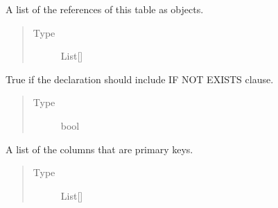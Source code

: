 \documentclass[letterpaper,10pt,english]{sphinxmanual}
\begin{document}
\begin{fulllineitems}
\begin{fulllineitems}
\end{fulllineitems}


\begin{fulllineitems}
\label{\detokenize{model:mini_sql.model.table.Table.__references}}
\sphinxAtStartPar
A list of the references of this table as objects.
\begin{quote}\begin{description}
\item[{Type}] \leavevmode
\sphinxAtStartPar
List{[}{\hyperref[\detokenize{model:mini_sql.model.foreign_key.ForeignKey}]{}}{]}

\end{description}\end{quote}

\end{fulllineitems}


\begin{fulllineitems}
\label{\detokenize{model:mini_sql.model.table.Table.__if_not_exists}}
\sphinxAtStartPar
True if the declaration should include IF NOT EXISTS clause.
\begin{quote}\begin{description}
\item[{Type}] \leavevmode
\sphinxAtStartPar
bool

\end{description}\end{quote}

\end{fulllineitems}


\begin{fulllineitems}
\label{\detokenize{model:mini_sql.model.table.Table.__primary_keys}}
\sphinxAtStartPar
A list of the columns that are primary keys.
\begin{quote}\begin{description}
\item[{Type}] \leavevmode
\sphinxAtStartPar
List{[}{\hyperref[\detokenize{model:mini_sql.model.column.Column}]{}}{]}


\end{description}
\end{quote}
\end{fulllineitems}
\end{fulllineitems}
\end{document}
